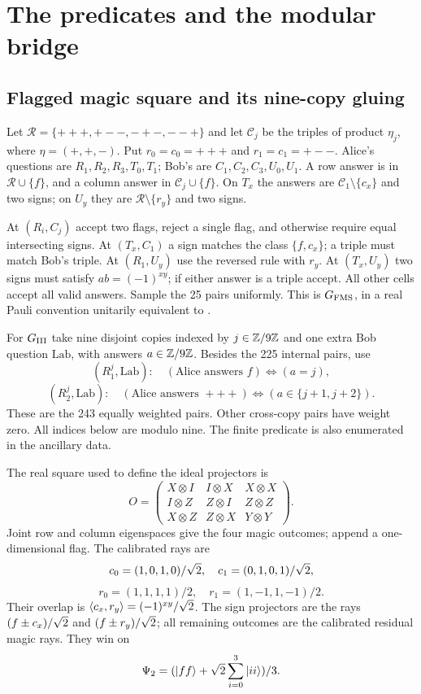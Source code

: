 \section{The predicates and the modular bridge}\label{sec:games}
\subsection{Flagged magic square and its nine-copy gluing}
Let $\mathcal R=\{+++,+--,-+-,--+\}$ and let $\mathcal C_j$ be the triples of product $\eta_j$, where $\eta=(+,+,-)$. Put $r_0=c_0=+++$ and $r_1=c_1=+--$. Alice's questions are $R_1,R_2,R_3,T_0,T_1$; Bob's are $C_1,C_2,C_3,U_0,U_1$. A row answer is in $\mathcal R\cup\{f\}$, and a column answer in $\mathcal C_j\cup\{f\}$. On $T_x$ the answers are $\mathcal C_1\setminus\{c_x\}$ and two signs; on $U_y$ they are $\mathcal R\setminus\{r_y\}$ and two signs.

At $(R_i,C_j)$ accept two flags, reject a single flag, and otherwise require equal intersecting signs. At $(T_x,C_1)$ a sign matches the class $\{f,c_x\}$; a triple must match Bob's triple. At $(R_1,U_y)$ use the reversed rule with $r_y$. At $(T_x,U_y)$ two signs must satisfy $ab=(-1)^{xy}$; if either answer is a triple accept. All other cells accept all valid answers. Sample the 25 pairs uniformly. This is $G_{\mathrm{FMS}}$, in a real Pauli convention unitarily equivalent to \cite{FMS}.

For $G_{\mathrm{III}}$ take nine disjoint copies indexed by $j\in\mathbb Z/9\mathbb Z$ and one extra Bob question $\mathrm{Lab}$, with answers $a\in\mathbb Z/9\mathbb Z$. Besides the 225 internal pairs, use
\[
 (R_1^j,\mathrm{Lab}):\quad (\text{Alice answers }f)\iff(a=j),
\]
\[
 (R_2^j,\mathrm{Lab}):\quad (\text{Alice answers }+++)\iff(a\in\{j+1,j+2\}).
\]
These are the 243 equally weighted pairs. Other cross-copy pairs have weight zero. All indices below are modulo nine. The finite predicate is also enumerated in the ancillary data.

The real square used to define the ideal projectors is
\[
 O=\begin{pmatrix}X\otimes I&I\otimes X&X\otimes X\\
 I\otimes Z&Z\otimes I&Z\otimes Z\\
 X\otimes Z&Z\otimes X&Y\otimes Y\end{pmatrix}.
\]
Joint row and column eigenspaces give the four magic outcomes; append a one-dimensional flag. The calibrated rays are
\[
 c_0=(1,0,1,0)/\sqrt2,\quad c_1=(0,1,0,1)/\sqrt2,
\]
\[
 r_0=(1,1,1,1)/2,\quad r_1=(1,-1,1,-1)/2.
\]
Their overlap is $\langle c_x,r_y\rangle=(-1)^{xy}/\sqrt2$. The sign projectors are the rays $(f\pm c_x)/\sqrt2$ and $(f\pm r_y)/\sqrt2$; all remaining outcomes are the calibrated residual magic rays. They win on
\[
 \Psi_2=(|ff\rangle+\sqrt2\sum_{i=0}^3|ii\rangle)/3.
\]

